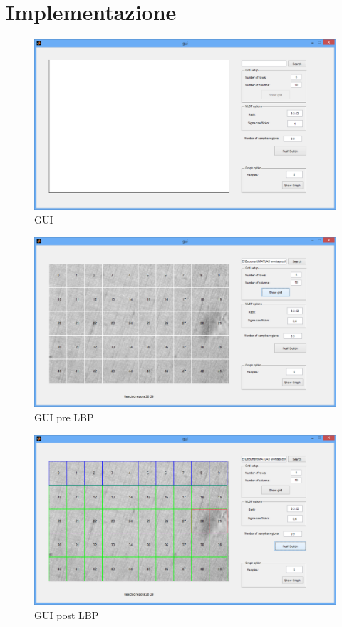 \section{Implementazione}

\begin{figure}
\begin{center}
\includegraphics[width=.95\textwidth]{img/gui}
\caption{ GUI }
\label{fig:GUI}
\end{center}
\end{figure}

\begin{figure}
\begin{center}
\includegraphics[width=.95\textwidth]{img/gui_pre_lbp}
\caption{ GUI pre LBP }
\label{fig:GUIpreLBP}
\end{center}
\end{figure}

\begin{figure}
\begin{center}
\includegraphics[width=.95\textwidth]{img/gui_post_lbp}
\caption{ GUI post LBP }
\label{fig:GUIpostLBP}
\end{center}
\end{figure}

